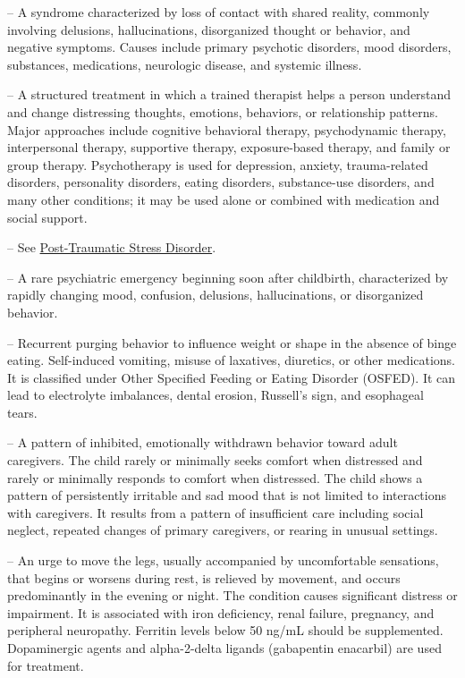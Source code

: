 -- A syndrome characterized by loss of contact with shared reality, commonly involving delusions, hallucinations, disorganized thought or behavior, and negative symptoms. Causes include primary psychotic disorders, mood disorders, substances, medications, neurologic disease, and systemic illness.


-- A structured treatment in which a trained therapist helps a person understand and change distressing thoughts, emotions, behaviors, or relationship patterns. Major approaches include cognitive behavioral therapy, psychodynamic therapy, interpersonal therapy, supportive therapy, exposure-based therapy, and family or group therapy. Psychotherapy is used for depression, anxiety, trauma-related disorders, personality disorders, eating disorders, substance-use disorders, and many other conditions; it may be used alone or combined with medication and social support.

-- See \hyperlink{Post-Traumatic Stress Disorder}{Post-Traumatic Stress Disorder}.

-- A rare psychiatric emergency beginning soon after childbirth, characterized by rapidly changing mood, confusion, delusions, hallucinations, or disorganized behavior.

-- Recurrent purging behavior to influence weight or shape in the absence of binge eating. Self-induced vomiting, misuse of laxatives, diuretics, or other medications. It is classified under Other Specified Feeding or Eating Disorder (OSFED). It can lead to electrolyte imbalances, dental erosion, Russell's sign, and esophageal tears.

-- A pattern of inhibited, emotionally withdrawn behavior toward adult caregivers. The child rarely or minimally seeks comfort when distressed and rarely or minimally responds to comfort when distressed. The child shows a pattern of persistently irritable and sad mood that is not limited to interactions with caregivers. It results from a pattern of insufficient care including social neglect, repeated changes of primary caregivers, or rearing in unusual settings.

-- An urge to move the legs, usually accompanied by uncomfortable sensations, that begins or worsens during rest, is relieved by movement, and occurs predominantly in the evening or night. The condition causes significant distress or impairment. It is associated with iron deficiency, renal failure, pregnancy, and peripheral neuropathy. Ferritin levels below 50 ng/mL should be supplemented. Dopaminergic agents and alpha-2-delta ligands (gabapentin enacarbil) are used for treatment.


